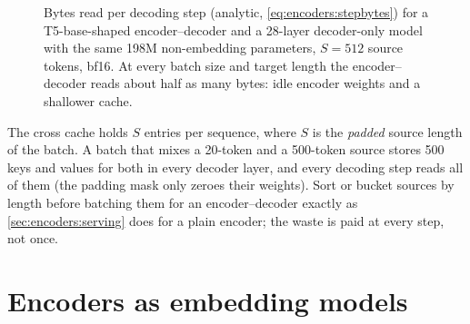 \begin{figure}[t]
\centering
{}
\caption{Bytes read per decoding step (analytic, \cref{eq:encoders:stepbytes}) for a T5-base-shaped
encoder--decoder and a 28-layer decoder-only model with the same 198M non-embedding parameters,
$S=512$ source tokens, bf16. At every batch size and target length the encoder--decoder reads about
half as many bytes: idle encoder weights and a shallower cache.}
\label{fig:encoders:stepbytes}
\end{figure}

\begin{pitfall}
The cross cache holds $S$ entries per sequence, where $S$ is the \emph{padded} source length of the
batch. A batch that mixes a 20-token and a 500-token source stores 500 keys and values for both in
every decoder layer, and every decoding step reads all of them (the padding mask only zeroes their
weights). Sort or bucket sources by length before batching them for an encoder--decoder exactly as
\cref{sec:encoders:serving} does for a plain encoder; the waste is paid at every step, not once.
\end{pitfall}

\section{Encoders as embedding models}\label{sec:encoders:embed}

